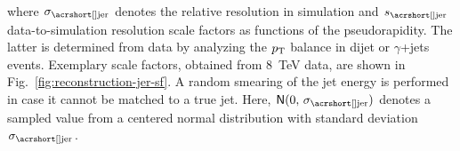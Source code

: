 where $\sigma_\mathrm{\gls{jer}}$ denotes the relative resolution in simulation and  $s_\mathrm{\gls{jer}}$ data-to-simulation resolution scale factors as functions of the pseudorapidity. The latter is determined from data by analyzing the $p_\textrm{T}$ balance in dijet or \mbox{$\gamma$+jets} events. Exemplary scale factors, obtained from 8~TeV data, are shown in Fig.~\ref{fig:reconstruction-jer-sf}. A random smearing of the jet energy is performed in case it cannot be matched to a true jet. Here, $\mathsf{N}(0,\,\sigma_\mathrm{\gls{jer}})$ denotes a sampled value from a centered normal distribution with standard deviation $\sigma_\mathrm{\gls{jer}}$.




